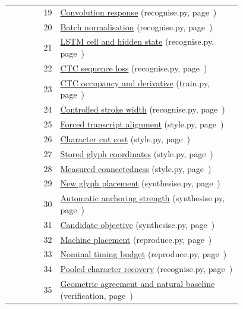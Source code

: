 \begin{longtable}{rp{0.78\linewidth}}
19 & \hyperref[report-eq:19]{Convolution response} (recognise.py, page~\pageref{report-eq:19})\\
20 & \hyperref[report-eq:20]{Batch normalisation} (recognise.py, page~\pageref{report-eq:20})\\
21 & \hyperref[report-eq:21]{LSTM cell and hidden state} (recognise.py, page~\pageref{report-eq:21})\\
22 & \hyperref[report-eq:22]{CTC sequence loss} (recognise.py, page~\pageref{report-eq:22})\\
23 & \hyperref[report-eq:23]{CTC occupancy and derivative} (train.py, page~\pageref{report-eq:23})\\
24 & \hyperref[report-eq:24]{Controlled stroke width} (recognise.py, page~\pageref{report-eq:24})\\
25 & \hyperref[report-eq:25]{Forced transcript alignment} (style.py, page~\pageref{report-eq:25})\\
26 & \hyperref[report-eq:26]{Character cut cost} (style.py, page~\pageref{report-eq:26})\\
27 & \hyperref[report-eq:27]{Stored glyph coordinates} (style.py, page~\pageref{report-eq:27})\\
28 & \hyperref[report-eq:28]{Measured connectedness} (style.py, page~\pageref{report-eq:28})\\
29 & \hyperref[report-eq:29]{New glyph placement} (synthesise.py, page~\pageref{report-eq:29})\\
30 & \hyperref[report-eq:30]{Automatic anchoring strength} (synthesise.py, page~\pageref{report-eq:30})\\
31 & \hyperref[report-eq:31]{Candidate objective} (synthesise.py, page~\pageref{report-eq:31})\\
32 & \hyperref[report-eq:32]{Machine placement} (reproduce.py, page~\pageref{report-eq:32})\\
33 & \hyperref[report-eq:33]{Nominal timing budget} (reproduce.py, page~\pageref{report-eq:33})\\
34 & \hyperref[report-eq:34]{Pooled character recovery} (recognise.py, page~\pageref{report-eq:34})\\
35 & \hyperref[report-eq:35]{Geometric agreement and natural baseline} (verification, page~\pageref{report-eq:35})\\
\bottomrule\end{longtable}